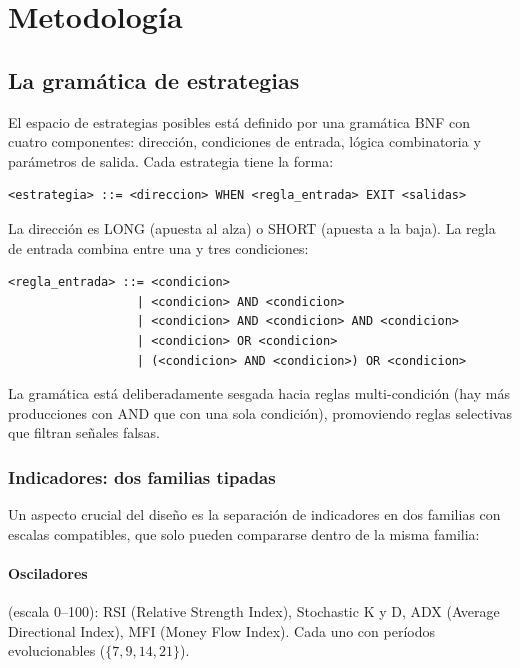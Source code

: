 \documentclass[12pt,a4paper]{article}
\begin{document}
\section{Metodología}
\label{sec:method}

\subsection{La gramática de estrategias}
\label{sec:grammar}

El espacio de estrategias posibles está definido por una gramática BNF con cuatro
componentes: dirección, condiciones de entrada, lógica combinatoria y parámetros
de salida. Cada estrategia tiene la forma:

\begin{lstlisting}[style=bnfstyle]
<estrategia> ::= <direccion> WHEN <regla_entrada> EXIT <salidas>
\end{lstlisting}

La dirección es LONG (apuesta al alza) o SHORT (apuesta a la baja). La regla de
entrada combina entre una y tres condiciones:

\begin{lstlisting}[style=bnfstyle]
<regla_entrada> ::= <condicion>
                  | <condicion> AND <condicion>
                  | <condicion> AND <condicion> AND <condicion>
                  | <condicion> OR <condicion>
                  | (<condicion> AND <condicion>) OR <condicion>
\end{lstlisting}

La gramática está deliberadamente sesgada hacia reglas multi-condición (hay más
producciones con AND que con una sola condición), promoviendo reglas selectivas que
filtran señales falsas.

\subsubsection{Indicadores: dos familias tipadas}

Un aspecto crucial del diseño es la separación de indicadores en dos familias con
escalas compatibles, que solo pueden compararse dentro de la misma familia:

\paragraph{Osciladores} (escala 0--100): RSI (Relative Strength Index), Stochastic
K y D, ADX (Average Directional Index), MFI (Money Flow Index). Cada uno con
períodos evolucionables ($\{7, 9, 14, 21\}$).
\end{document}
